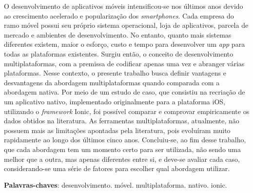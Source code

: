 \begin{resumo}

 O desenvolvimento de aplicativos móveis intensificou-se nos últimos anos devido ao crescimento acelerado e popularização dos \textit{smartphones}. Cada empresa
 do ramo móvel possui seu próprio sistema operacional, loja de aplicativos, parcela de mercado e ambientes de desenvolvimento. No entanto, quanto mais 
 sistemas diferentes existem, maior o esforço, custo e tempo para desenvolver um \textit{app} para todas as plataformas existentes. Surgiu então, o conceito de desenvolvimento multiplataformas,
 com a premissa de codificar apenas uma vez e abranger várias plataformas. Nesse contexto, o presente trabalho busca definir vantagens e desvantagens da abordagem
 multiplataformas quando comparada com a abordagem nativa. Por meio de um estudo de caso, que consistiu na recriação de um aplicativo nativo, implementado originalmente para a plataforma iOS,
 utilizando o \textit{framework} Ionic, foi possível comparar e comprovar empiricamente os dados obtidos na literatura. As ferramentas multiplataformas, atualmente,
 não possuem mais as limitações apontadas pela literatura, pois evoluíram muito rapidamente ao longo dos últimos cinco anos. Concluiu-se, ao fim desse trabalho, que cada abordagem tem um momento certo
 para ser utilizada, não sendo uma melhor que a outra, mas apenas diferentes entre si, e deve-se avaliar cada caso, considerando-se uma série de fatores para escolher qual abordagem utilizar.

 \vspace{\onelineskip}
    
 \noindent
 \textbf{Palavras-chaves}: desenvolvimento. móvel. multiplataforma. nativo. ionic. 
\end{resumo}
